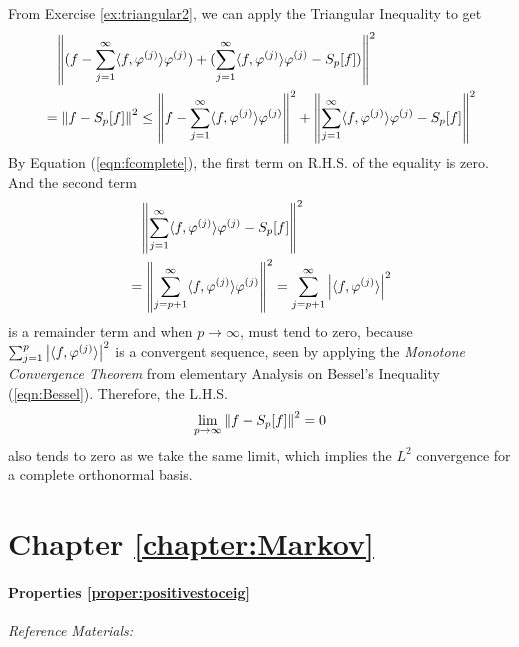 From Exercise \ref{ex:triangular2}, we can apply the Triangular Inequality to get
\begin{align}
&\quad \norm{(f - \sum_{j=1}^{\infty} \langle f, \varphi^{(j)} \rangle \varphi^{(j)}) + (\sum_{j=1}^{\infty} \langle f, \varphi^{(j)} \rangle \varphi^{(j)} - S_p[f])}^2 \nonumber \\
&= \norm{f - S_p[f]}^2 \leq \norm{f - \sum_{j=1}^{\infty} \langle f, \varphi^{(j)} \rangle \varphi^{(j)}}^2 + \norm{\sum_{j=1}^{\infty} \langle f, \varphi^{(j)} \rangle \varphi^{(j)} - S_p[f]}^2
\end{align}
By Equation (\ref{eqn:fcomplete}), the first term on R.H.S. of the equality is zero. And the second term
\begin{align}
&\quad \norm{\sum_{j=1}^{\infty} \langle f, \varphi^{(j)} \rangle \varphi^{(j)} - S_p[f]}^2 \nonumber \\
&= \norm{\sum_{j=p+1}^{\infty} \langle f, \varphi^{(j)} \rangle \varphi^{(j)}}^2 = \sum_{j=p+1}^{\infty} \abs{\langle f, \varphi^{(j)} \rangle}^2
\end{align}
is a remainder term and when $p \to \infty$, must tend to zero, because $\sum_{j=1}^{p} \abs{\langle f, \varphi^{(j)} \rangle}^2$ is a convergent sequence, seen by applying the \textit{Monotone Convergence Theorem} from elementary Analysis on Bessel's Inequality (\ref{eqn:Bessel}). Therefore, the L.H.S.
\begin{align}
\lim_{p \to \infty}\norm{f - S_p[f]}^2 = 0
\end{align}
also tends to zero as we take the same limit, which implies the $L^2$ convergence for a complete orthonormal basis.

\section{Chapter \ref*{chapter:Markov}}
\label{section:Markovappend}

\paragraph{Properties \ref*{proper:positivestoceig}}

\textit{Reference Materials: \cite{markov}}

